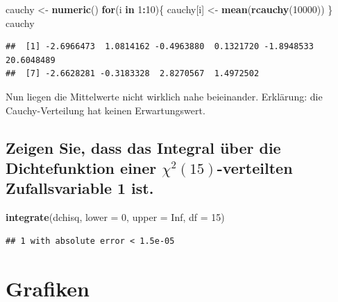\documentclass[12pt,a4paper]{article}
\newenvironment{Shaded}{\begin{snugshade}}{\end{snugshade}}
\newcommand{\AttributeTok}[1]{\textcolor[rgb]{0.13,0.29,0.53}{#1}}
\newcommand{\ConstantTok}[1]{\textcolor[rgb]{0.56,0.35,0.01}{#1}}
\newcommand{\ControlFlowTok}[1]{\textcolor[rgb]{0.13,0.29,0.53}{\textbf{#1}}}
\newcommand{\DecValTok}[1]{\textcolor[rgb]{0.00,0.00,0.81}{#1}}
\newcommand{\FunctionTok}[1]{\textcolor[rgb]{0.13,0.29,0.53}{\textbf{#1}}}
\newcommand{\NormalTok}[1]{#1}
\newcommand{\OtherTok}[1]{\textcolor[rgb]{0.56,0.35,0.01}{#1}}
\newcommand{\SpecialCharTok}[1]{\textcolor[rgb]{0.81,0.36,0.00}{\textbf{#1}}}
\begin{document}
\begin{Shaded}
\begin{Highlighting}[]
\NormalTok{    cauchy }\OtherTok{\textless{}{-}} \FunctionTok{numeric}\NormalTok{()}
    \ControlFlowTok{for}\NormalTok{(i }\ControlFlowTok{in} \DecValTok{1}\SpecialCharTok{:}\DecValTok{10}\NormalTok{)\{}
\NormalTok{      cauchy[i] }\OtherTok{\textless{}{-}} \FunctionTok{mean}\NormalTok{(}\FunctionTok{rcauchy}\NormalTok{(}\DecValTok{10000}\NormalTok{))}
\NormalTok{    \}}
\NormalTok{    cauchy}
\end{Highlighting}
\end{Shaded}

\begin{verbatim}
##  [1] -2.6966473  1.0814162 -0.4963880  0.1321720 -1.8948533 20.6048489
##  [7] -2.6628281 -0.3183328  2.8270567  1.4972502
\end{verbatim}

Nun liegen die Mittelwerte nicht wirklich nahe beieinander. Erklärung:
die Cauchy-Verteilung hat keinen Erwartungswert.

\subsection{\texorpdfstring{Zeigen Sie, dass das Integral über die
Dichtefunktion einer \(\chi^2(15)\)-verteilten Zufallsvariable 1
ist.}{Zeigen Sie, dass das Integral über die Dichtefunktion einer \textbackslash chi\^{}2(15)-verteilten Zufallsvariable 1 ist.}}\label{zeigen-sie-dass-das-integral-uxfcber-die-dichtefunktion-einer-chi215-verteilten-zufallsvariable-1-ist.}

\begin{Shaded}
\begin{Highlighting}[]
    \FunctionTok{integrate}\NormalTok{(dchisq, }\AttributeTok{lower =} \DecValTok{0}\NormalTok{, }\AttributeTok{upper =} \ConstantTok{Inf}\NormalTok{, }\AttributeTok{df =} \DecValTok{15}\NormalTok{)}
\end{Highlighting}
\end{Shaded}

\begin{verbatim}
## 1 with absolute error < 1.5e-05
\end{verbatim}

\newpage

\section{Grafiken}\label{grafiken}
\end{document}
